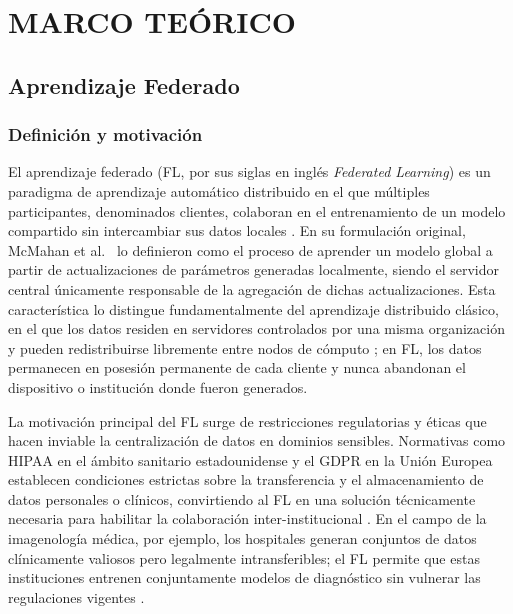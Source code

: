 \chapter{MARCO TE\'ORICO}

\section{Aprendizaje Federado}

\subsection{Definición y motivación}

El aprendizaje federado (FL, por sus siglas en inglés \textit{Federated Learning}) es un paradigma
de aprendizaje automático distribuido en el que múltiples participantes, denominados clientes,
colaboran en el entrenamiento de un modelo compartido sin intercambiar sus datos locales
\cite{DBLP:journals/corr/McMahanMRA16}. En su formulación original, McMahan et al.\
\cite{DBLP:journals/corr/McMahanMRA16} lo definieron como el proceso de aprender un modelo
global a partir de actualizaciones de parámetros generadas localmente, siendo el servidor central
únicamente responsable de la agregación de dichas actualizaciones. Esta característica lo
distingue fundamentalmente del aprendizaje distribuido clásico, en el que los datos residen
en servidores controlados por una misma organización y pueden redistribuirse libremente entre
nodos de cómputo \cite{DBLP:journals/corr/abs-1908-07873}; en FL, los datos permanecen en
posesión permanente de cada cliente y nunca abandonan el dispositivo o institución donde fueron
generados.

La motivación principal del FL surge de restricciones regulatorias y éticas que hacen inviable
la centralización de datos en dominios sensibles. Normativas como HIPAA en el ámbito sanitario estadounidense y el GDPR en la Unión Europea establecen condiciones estrictas
sobre la transferencia y el almacenamiento de datos personales o clínicos, convirtiendo al FL en
una solución técnicamente necesaria para habilitar la colaboración inter-institucional
\cite{noor2026federated}. En el campo de la imagenología médica, por ejemplo, los hospitales
generan conjuntos de datos clínicamente valiosos pero legalmente intransferibles; el FL permite
que estas instituciones entrenen conjuntamente modelos de diagnóstico sin vulnerar las
regulaciones vigentes \cite{noor2026federated, appasami2025federated}.

